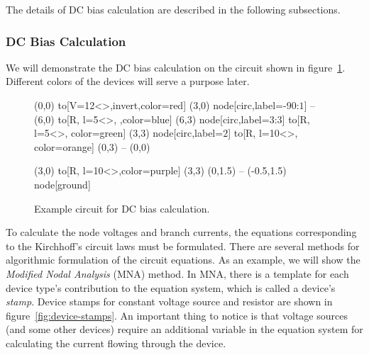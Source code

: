 The details of DC bias calculation are described in the following subsections.
\subsubsection{DC Bias Calculation} 

We will demonstrate the DC bias calculation on the circuit shown in figure~\ref{fig:analysis:ls-bias-circuit}. Different colors of the devices will serve a purpose later.

\begin{figure}[h]
\begin{circuitdev}
	(0,0) 
	to[V=12<\volt>,invert,color=red] (3,0) node[circ,label={-90:$1$}]{}
	-- (6,0)
	to[R, l=5<\ohm>, ,color=blue] (6,3) node[circ,label={3:$3$}]{}
	to[R, l=5<\ohm>, color=green] (3,3) node[circ,label={$2$}]{}
	to[R, l=10<\ohm>, color=orange] (0,3)
	-- (0,0)
	
	(3,0) to[R, l=10<\ohm>,color=purple] (3,3)
	(0,1.5) -- (-0.5,1.5) node[ground]{}
\end{circuitdev}	
	\caption{Example circuit for DC bias calculation.}
	\label{fig:analysis:ls-bias-circuit}
\end{figure}


To calculate the node voltages and branch currents, the equations corresponding to the Kirchhoff's circuit laws must be formulated. There are several methods for algorithmic formulation of the circuit equations. As an example, we will show the \textit{Modified Nodal Analysis} (MNA) method. In MNA, there is a template for each device type's contribution to the equation system, which is called a device's \textit{stamp}. Device stamps for constant voltage source and resistor are shown in figure~\ref{fig:device-stamps}. An important thing to notice is that voltage sources (and some other devices) require an additional variable in the equation system for calculating the current flowing through the device.

